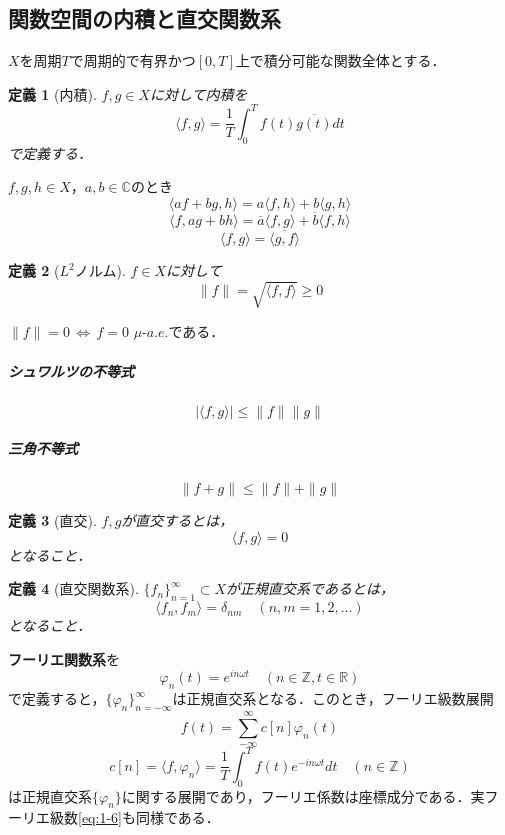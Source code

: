 \documentclass[dvipdfmx,a4j,10pt]{jsarticle}
\theoremstyle{mystyle1}
\theoremstyle{mystyle3}
\theoremstyle{mystyle4}
\theoremstyle{mystyle2}
\newtheorem{dfn*}{定義}
\begin{document}
\subsection{関数空間の内積と直交関数系}


$X$を周期$T$で周期的で有界かつ$[0,T]$上で積分可能な関数全体とする．

\begin{dfn*}[内積]
    $f,g\in X$に対して内積を
    \[
        \langle f,g \rangle=\frac{1}{T}\int_0^T f(t)\overline{g(t)}dt
    \]
    で定義する．
\end{dfn*}

$f,g,h\in X$，$a,b\in\mathbb{C}$のとき
\[
    \langle af+bg,h\rangle=a\langle f,h\rangle +b\langle g,h\rangle
\]
\[
    \langle f,ag+bh\rangle=\overline{a}\langle f,g\rangle +\overline{b}\langle f,h\rangle
\]
\[
    \langle f,g\rangle=\overline{\langle g,f\rangle}
\]

\begin{dfn*}[$L^2$ノルム]
    $f\in X$に対して
    \[
        \|f\|=\sqrt{\langle f,f\rangle}\geq 0
    \]
\end{dfn*}

$\|f\|=0\,\Leftrightarrow\,f=0$ $\mu$-$a.e.$である．

\subparagraph{シュワルツの不等式}

\begin{equation}\label{eq:1-18}
    |\langle f,g\rangle|\leq\|f\|\|g\|
\end{equation}

\subparagraph{三角不等式}

\begin{equation}\label{eq:1-19}
    \|f+g\|\leq\|f\|+\|g\|
\end{equation}

\begin{dfn*}[直交]
    $f,g$が直交するとは，
    \[
        \langle f,g\rangle=0
    \]
    となること．
\end{dfn*}

\begin{dfn*}[直交関数系]
    $\{f_n\}_{n=1}^\infty \subset X$が正規直交系であるとは，
    \[
        \langle f_n,f_m\rangle=\delta_{nm}\quad(n,m=1,2,\ldots)
    \]
    となること．
\end{dfn*}

\textbf{フーリエ関数系}を
\[
    \varphi_n(t)=e^{in\omega t}\quad(n\in\mathbb{Z},t\in\mathbb{R})
\]
で定義すると，$\{\varphi_n\}_{n=-\infty}^\infty$は正規直交系となる．このとき，フーリエ級数展開
\[
    f(t)=\sum_{-\infty}^\infty c[n]\varphi_n(t)
\]
\[
    c[n]=\langle f,\varphi_n \rangle=\frac{1}{T}\int_0^T f(t)e^{-in\omega t}dt\quad(n\in\mathbb{Z})
\]
は正規直交系$\{\varphi_n\}$に関する展開であり，フーリエ係数は座標成分である．実フーリエ級数\eqref{eq:1-6}も同様である．
\end{document}
